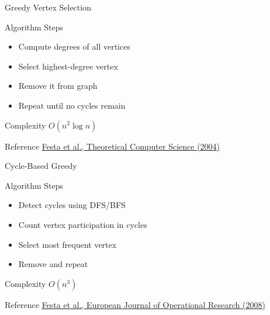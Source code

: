 \documentclass[aspectratio=169]{beamer}
\begin{document}
\begin{frame}{Greedy Vertex Selection}

\begin{block}{Algorithm Steps}
\begin{itemize}
\item Compute degrees of all vertices
\item Select highest-degree vertex
\item Remove it from graph
\item Repeat until no cycles remain
\end{itemize}
\end{block}

\begin{exampleblock}{Complexity}
$O(n^2 \log n)$
\end{exampleblock}

\begin{alertblock}{Reference}
\href{https://doi.org/10.1016/j.tcs.2004.12.001}{Festa et al., Theoretical Computer Science (2004)}
\end{alertblock}

\end{frame}

\begin{frame}{Cycle-Based Greedy}

\begin{block}{Algorithm Steps}
\begin{itemize}
\item Detect cycles using DFS/BFS
\item Count vertex participation in cycles
\item Select most frequent vertex
\item Remove and repeat
\end{itemize}
\end{block}

\begin{exampleblock}{Complexity}
$O(n^3)$
\end{exampleblock}

\begin{alertblock}{Reference}
\href{https://doi.org/10.1016/j.ejor.2007.01.060}{Festa et al., European Journal of Operational Research (2008)}
\end{alertblock}

\end{frame}
\end{document}
